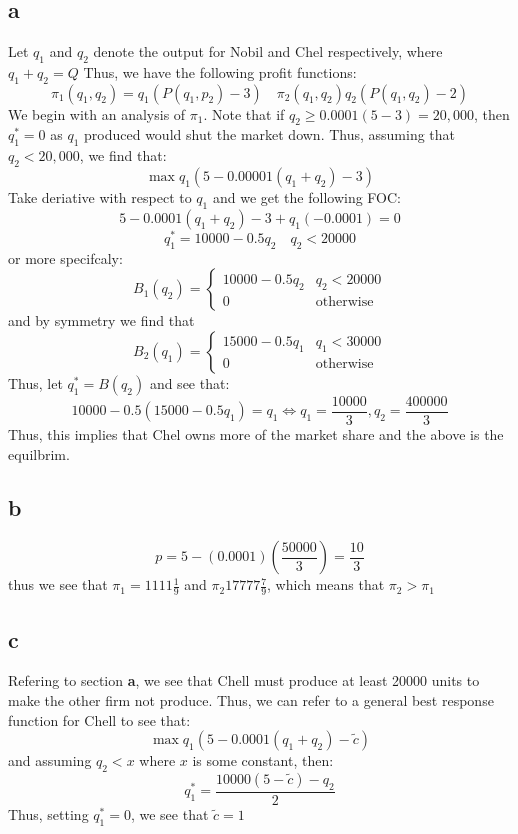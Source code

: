 \documentclass[11pt]{article}
\begin{document}
\section{}
\subsection*{a}
Let $q_1$ and $q_2$ denote the output for Nobil and Chel respectively, where $q_1 + q_2 = Q$ Thus, we have the following profit functions:
\[
\pi_1(q_1, q_2) = q_1(P(q_1, p_2) - 3) \quad \pi_2 (q_1, q_2) q_2(P(q_1,q_2) - 2)
\]
We begin with an analysis of $\pi_1$. Note that if $q_2 \geq 0.0001(5-3) = 20,000$, then $q_1^* = 0$ as $q_1$ produced would shut the market down. Thus, assuming that $q_2 < 20,000$,
we find that:
\[
\max q_1(5-0.00001(q_1 + q_2) - 3)
\]
Take deriative with respect to $q_1$ and we get the following FOC:
\[
5 - 0.0001(q_1 + q_2) - 3 + q_1(-0.0001) = 0
\]
\[
q_1^* = 10000 -0.5q_2 \quad q_2 < 20000
\]
or more specifcaly:
\[
B_1(q_2) = \begin{cases}
    10000 -0.5q_2 & q_2 < 20000\\
    0 & \text{otherwise}
\end{cases}
\]
and by symmetry we find that 
\[
B_2(q_1) = \begin{cases}
    15000 - 0.5q_1 & q_1 < 30000\\
    0 & \text{otherwise}
\end{cases}
\]
Thus, let $q_1^* = B(q_2)$ and see that:
\[
10000 -0.5(15000 -0.5q_1) = q_1 \iff q_1 = \frac{10000}{3}, q_2 = \frac{400000}{3}
\]
Thus, this implies that Chel owns more of the market share and the above is the equilbrim. 
\subsection*{b}
\[
p = 5 - (0.0001)\left( \frac{50000}{3} \right) = \frac{10}{3}
\]
thus we see that $\pi_1 = 1111 \frac{1}{9}$ and $\pi_2 17777\frac{7}{9}$, which means that $\pi_2 > \pi_1$
\subsection*{c}
Refering to section \textbf{a}, we see that Chell must produce at least 20000 units to make the other firm not produce. Thus, we can refer to a general best response function for Chell to see that:
\[
\max q_1(5-0.0001(q_1+q_2) - \tilde{c}) 
\]
and assuming $q_2 < x$ where $x$ is some constant, then:
\[
q_1^* = \frac{10000(5-\tilde{c}) - q_2}{2}
\]
Thus, setting $q_1^* = 0$, we see that $\tilde{c} = 1$
\end{document}
